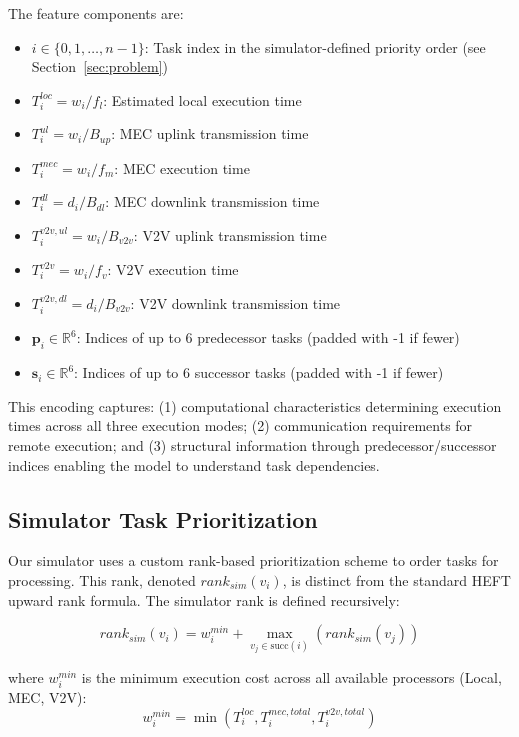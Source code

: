 \documentclass[journal,twoside]{IEEEtran}
\newcommand{\R}{\mathbb{R}}
\begin{document}
The feature components are:
\begin{itemize}
    \item $i \in \{0, 1, \ldots, n-1\}$: Task index in the simulator-defined priority order (see Section~\ref{sec:problem})
    \item $T_i^{loc} = w_i / f_l$: Estimated local execution time
    \item $T_i^{ul} = w_i / B_{up}$: MEC uplink transmission time
    \item $T_i^{mec} = w_i / f_m$: MEC execution time
    \item $T_i^{dl} = d_i / B_{dl}$: MEC downlink transmission time
    \item $T_i^{v2v,ul} = w_i / B_{v2v}$: V2V uplink transmission time
    \item $T_i^{v2v} = w_i / f_v$: V2V execution time
    \item $T_i^{v2v,dl} = d_i / B_{v2v}$: V2V downlink transmission time
    \item $\mathbf{p}_i \in \R^6$: Indices of up to 6 predecessor tasks (padded with -1 if fewer)
    \item $\mathbf{s}_i \in \R^6$: Indices of up to 6 successor tasks (padded with -1 if fewer)
\end{itemize}

This encoding captures: (1) computational characteristics determining execution times across all three execution modes; (2) communication requirements for remote execution; and (3) structural information through predecessor/successor indices enabling the model to understand task dependencies.

\subsection{Simulator Task Prioritization}

Our simulator uses a custom rank-based prioritization scheme to order tasks for processing. This rank, denoted $rank_{sim}(v_i)$, is distinct from the standard HEFT upward rank formula. The simulator rank is defined recursively:

\begin{equation}
rank_{sim}(v_i) = w_i^{min} + \max_{v_j \in \text{succ}(i)} \left( rank_{sim}(v_j) \right)
\label{eq:rank_priority}
\end{equation}

where $w_i^{min}$ is the minimum execution cost across all available processors (Local, MEC, V2V):
\begin{equation}
w_i^{min} = \min \left( T_i^{loc}, T_i^{mec, total}, T_i^{v2v, total} \right)
\end{equation}
\end{document}
